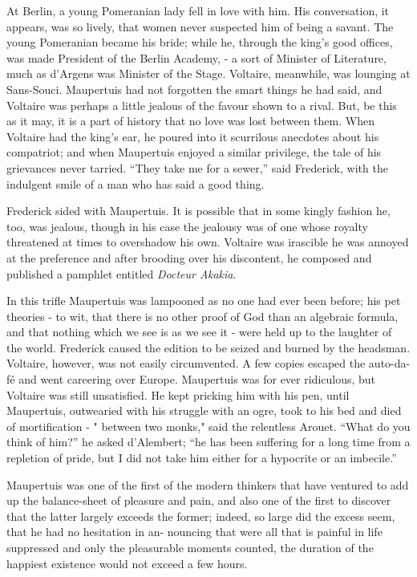 \documentclass[]{book}
\begin{document}
At Berlin, a young Pomeranian lady fell in love with him. His
conversation, it appears, was so lively, that women never suspected him
of being a savant. The young Pomeranian became his bride; while he,
through the king's good offices, was made President of the Berlin
Academy, - a sort of Minister of Literature, much as d'Argens was
Minister of the Stage. Voltaire, meanwhile, was lounging at Sans-Souci.
Maupertuis had not forgotten the smart things he had said, and Voltaire
was perhaps a little jealous of the favour shown to a rival. But, be
this as it may, it is a part of history that no love was lost between
them. When Voltaire had the king's ear, he poured into it scurrilous
anecdotes about his compatriot; and when Maupertuis enjoyed a similar
privilege, the tale of his grievances never tarried. ``They take me for
a sewer,'' said Frederick, with the indulgent smile of a man who has
said a good thing.

Frederick sided with Maupertuis. It is possible that in some kingly
fashion he, too, was jealous, though in his case the jealousy was of one
whose royalty threatened at times to overshadow his own. Voltaire was
irascible he was annoyed at the preference and after brooding over his
discontent, he composed and published a pamphlet entitled \emph{Docteur
Akakia}.

In this trifle Maupertuis was lampooned as no one had ever been before;
his pet theories - to wit, that there is no other proof of God than an
algebraic formula, and that nothing which we see is as we see it - were
held up to the laughter of the world. Frederick caused the edition to be
seized and burned by the headsman. Voltaire, however, was not easily
circumvented. A few copies escaped the auto-da-fé and went careering
over Europe. Maupertuis was for ever ridiculous, but Voltaire was still
unsatisfied. He kept pricking him with his pen, until Maupertuis,
outwearied with his struggle with an ogre, took to his bed and died of
mortification - " between two monks," said the relentless Arouet. ``What
do you think of him?'' he asked d'Alembert; ``he has been suffering for
a long time from a repletion of pride, but I did not take him either for
a hypocrite or an imbecile.''

Maupertuis was one of the first of the modern thinkers that have
ventured to add up the balance-sheet of pleasure and pain, and also one
of the first to discover that the latter largely exceeds the former;
indeed, so large did the excess seem, that he had no hesitation in an-
nouncing that were all that is painful in life suppressed and only the
pleasurable moments counted, the duration of the happiest existence
would not exceed a few hours.
\end{document}
